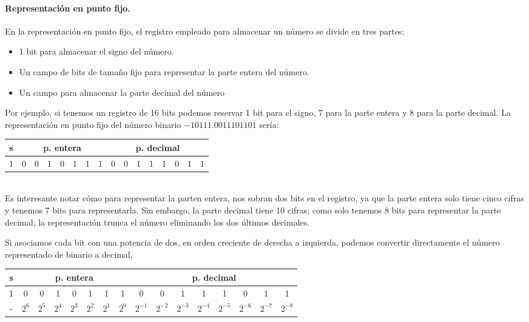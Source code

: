 \paragraph*{Representación en punto fijo.} En la representación en punto fijo, el registro empleado para almacenar un número se divide en tres partes: 
\begin{itemize}
\item 1 bit para almacenar el signo del número.  
\item Un campo de bits de tamaño fijo para representar la parte entera del número.
\item Un campo para almacenar la parte decimal del número
\end{itemize}

Por ejemplo, si tenemos un registro de 16 bits podemos reservar 1 bit para el signo, 7 para la parte entera y 8 para la parte decimal.  La representación en punto fijo del número binario $-10111.0011101101$ sería: \\


\begin{tabular}{|c||c|c|c|c|c|c|c||c|c|c|c|c|c|c|c|}
\hline
s&\multicolumn{7}{c||}{p. entera}&\multicolumn{8}{c|}{p. decimal}\\
\hline
1&0&0&1&0&1&1&1&0&0&1&1&1&0&1&1\\
\hline
\end{tabular}\\

Es interesante notar cómo para representar la parten entera, nos sobran dos bits en el registro, ya que la parte entera solo tiene cinco cifras y tenemos 7 bits para representarla. Sin embargo, la parte decimal tiene 10 cifras; como solo tenemos 8 bits para representar la parte decimal, la representación trunca el número eliminando los dos últimos decimales.

Si asociamos cada bit con una potencia de dos, en orden creciente de derecha a izquierda, podemos convertir directamente el número representado de binario a decimal,\\ 

\begin{tabular}{|c||c|c|c|c|c|c|c||c|c|c|c|c|c|c|c|}
\hline
s&\multicolumn{7}{c||}{p. entera}&\multicolumn{8}{c|}{p. decimal}\\
\hline
1&0&0&1&0&1&1&1&0&0&1&1&1&0&1&1\\
\hline
-&$2^{6}$&$2^{5}$&$2^{4}$&$2^{3}$&$2^{2}$&$2^{1}$&$2^{0}$&$2^{-1}$&$2^{-2}$&$2^{-3}$&$2^{-4}$&$2^{-5}$&$2^{-6}$&$2^{-7}$&$2^{-8}$\\
\hline
\end{tabular}\\

